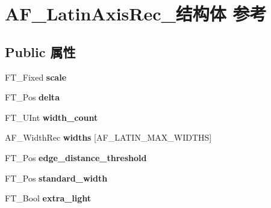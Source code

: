 \hypertarget{struct_a_f___latin_axis_rec__}{}\section{A\+F\+\_\+\+Latin\+Axis\+Rec\+\_\+结构体 参考}
\label{struct_a_f___latin_axis_rec__}
\subsection*{Public 属性}
\begin{DoxyCompactItemize}
\item 
\mbox{\label{struct_a_f___latin_axis_rec___ac59ded22f8b7e8990afa1b57844aa4c0}} 
F\+T\+\_\+\+Fixed {\bfseries scale}
\item 
\mbox{\label{struct_a_f___latin_axis_rec___a5a9438869fa1e7250a76387d1a6c8c59}} 
F\+T\+\_\+\+Pos {\bfseries delta}
\item 
\mbox{\label{struct_a_f___latin_axis_rec___aa528c1f3cecc6081c07aac94b01725b0}} 
F\+T\+\_\+\+U\+Int {\bfseries width\+\_\+count}
\item 
\mbox{\label{struct_a_f___latin_axis_rec___a58ea9510ab20d3371f321380ce908c03}} 
A\+F\+\_\+\+Width\+Rec {\bfseries widths} \mbox{[}A\+F\+\_\+\+L\+A\+T\+I\+N\+\_\+\+M\+A\+X\+\_\+\+W\+I\+D\+T\+HS\mbox{]}
\item 
\mbox{\label{struct_a_f___latin_axis_rec___a5d07185dec6434da53d28ffb5b56393c}} 
F\+T\+\_\+\+Pos {\bfseries edge\+\_\+distance\+\_\+threshold}
\item 
\mbox{\label{struct_a_f___latin_axis_rec___a6a78623da63d74c528dc9465a5673272}} 
F\+T\+\_\+\+Pos {\bfseries standard\+\_\+width}
\item 
\mbox{\label{struct_a_f___latin_axis_rec___a199c0db85867ed5960abf645d259985f}} 
F\+T\+\_\+\+Bool {\bfseries extra\+\_\+light}
\item 
\mbox{\label{struct_a_f___latin_axis_rec___af52623b09609e5aa78d2660189b1ed2a}} 

\end{DoxyCompactItemize}
